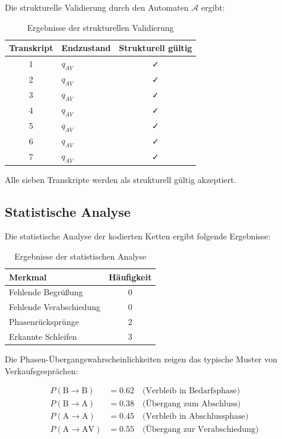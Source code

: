 \documentclass[
  12pt,
  a4paper,
  oneside,
  titlepage
]{article}
\begin{document}
Die strukturelle Validierung durch den Automaten \(\mathcal{A}\) ergibt:

\begin{table}[h]
\centering
\caption{Ergebnisse der strukturellen Validierung}
\label{tab:validierung}
\begin{tabular}{@{} c l c @{}}
\toprule
\textbf{Transkript} & \textbf{Endzustand} & \textbf{Strukturell gültig} \\
\midrule
1 & \(q_{AV}\) & ✓ \\
2 & \(q_{AV}\) & ✓ \\
3 & \(q_{AV}\) & ✓ \\
4 & \(q_{AV}\) & ✓ \\
5 & \(q_{AV}\) & ✓ \\
6 & \(q_{AV}\) & ✓ \\
7 & \(q_{AV}\) & ✓ \\
\bottomrule
\end{tabular}
\end{table}

Alle sieben Transkripte werden als strukturell gültig akzeptiert.

\subsection{Statistische Analyse}

Die statistische Analyse der kodierten Ketten ergibt folgende 
Ergebnisse:

\begin{table}[h]
\centering
\caption{Ergebnisse der statistischen Analyse}
\label{tab:statistik}
\begin{tabular}{@{} l c @{}}
\toprule
\textbf{Merkmal} & \textbf{Häufigkeit} \\
\midrule
Fehlende Begrüßung & 0 \\
Fehlende Verabschiedung & 0 \\
Phasenrücksprünge & 2 \\
Erkannte Schleifen & 3 \\
\bottomrule
\end{tabular}
\end{table}

Die Phasen-Übergangswahrscheinlichkeiten zeigen das typische Muster 
von Verkaufsgesprächen:

\begin{align*}
P(\text{B} \to \text{B}) &= 0.62 \quad \text{(Verbleib in Bedarfsphase)} \\
P(\text{B} \to \text{A}) &= 0.38 \quad \text{(Übergang zum Abschluss)} \\
P(\text{A} \to \text{A}) &= 0.45 \quad \text{(Verbleib in Abschlussphase)} \\
P(\text{A} \to \text{AV}) &= 0.55 \quad \text{(Übergang zur Verabschiedung)}
\end{align*}
\end{document}
